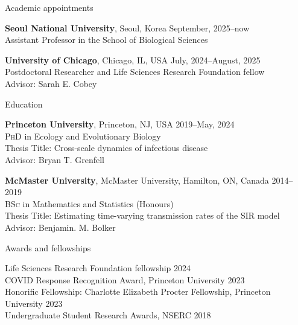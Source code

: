 \documentclass[
	11pt, %
]{resume} %
\begin{document}

\begin{rSection}{Academic appointments}

  \textbf{Seoul National University}, Seoul, Korea \hfill September, 2025--now \\ 
  Assistant Professor in the School of Biological Sciences

	\textbf{University of Chicago}, Chicago, IL, USA \hfill July, 2024--August, 2025 \\ 
	Postdoctoral Researcher and Life Sciences Research Foundation fellow\\
	Advisor: Sarah E. Cobey
\end{rSection}


\begin{rSection}{Education}
	
	\textbf{Princeton University}, Princeton, NJ, USA \hfill 2019--May, 2024 \\ 
	\textsc{PhD} in Ecology and Evolutionary Biology\\
	Thesis Title: Cross-scale dynamics of infectious disease\\
	Advisor: Bryan T. Grenfell
	
	\textbf{McMaster University}, McMaster University, Hamilton, ON, Canada \hfill 2014--2019 \\ 
	\textsc{BSc} in Mathematics and Statistics (Honours)\\
	Thesis Title: Estimating time-varying transmission rates of the SIR model\\
	Advisor: Benjamin. M. Bolker
	
\end{rSection}


\begin{rSection}{Awards and fellowships}

Life Sciences Research Foundation fellowship \hfill 2024\\
COVID Response Recognition Award, Princeton University \hfill 2023\\
Honorific Fellowship: Charlotte Elizabeth Procter Fellowship, Princeton University  \hfill 2023\\
Undergraduate Student Research Awards, NSERC \hfill 2018

\end{rSection}
\end{document}
